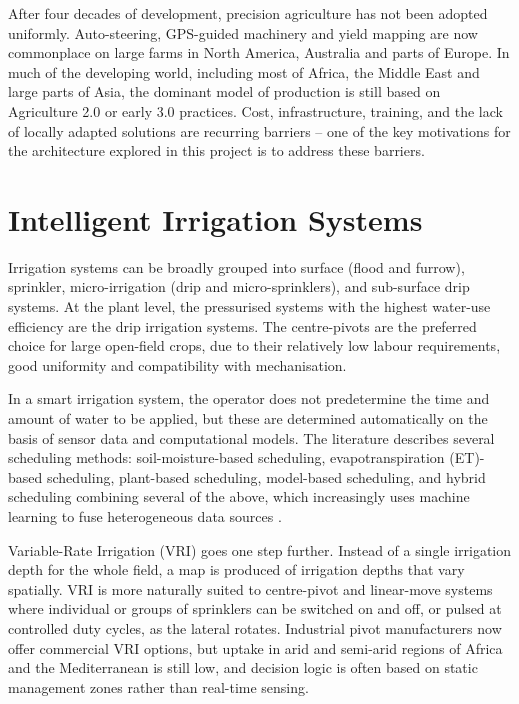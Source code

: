\documentclass[12pt,a4paper]{report}
\begin{document}
After four decades of development, precision agriculture has not been adopted uniformly. Auto-steering, GPS-guided machinery and yield mapping are now commonplace on large farms in North America, Australia and parts of Europe. In much of the developing world, including most of Africa, the Middle East and large parts of Asia, the dominant model of production is still based on Agriculture 2.0 or early 3.0 practices. Cost, infrastructure, training, and the lack of locally adapted solutions are recurring barriers -- one of the key motivations for the architecture explored in this project is to address these barriers.

\section{Intelligent Irrigation Systems}

Irrigation systems can be broadly grouped into surface (flood and furrow), sprinkler, micro-irrigation (drip and micro-sprinklers), and sub-surface drip systems. At the plant level, the pressurised systems with the highest water-use efficiency are the drip irrigation systems. The centre-pivots are the preferred choice for large open-field crops, due to their relatively low labour requirements, good uniformity and compatibility with mechanisation.

In a smart irrigation system, the operator does not predetermine the time and amount of water to be applied, but these are determined automatically on the basis of sensor data and computational models. The literature describes several scheduling methods: soil-moisture-based scheduling, evapotranspiration (ET)-based scheduling, plant-based scheduling, model-based scheduling, and hybrid scheduling combining several of the above, which increasingly uses machine learning to fuse heterogeneous data sources .

Variable-Rate Irrigation (VRI) goes one step further. Instead of a single irrigation depth for the whole field, a map is produced of irrigation depths that vary spatially. VRI is more naturally suited to centre-pivot and linear-move systems where individual or groups of sprinklers can be switched on and off, or pulsed at controlled duty cycles, as the lateral rotates. Industrial pivot manufacturers now offer commercial VRI options, but uptake in arid and semi-arid regions of Africa and the Mediterranean is still low, and decision logic is often based on static management zones rather than real-time sensing.
\end{document}
